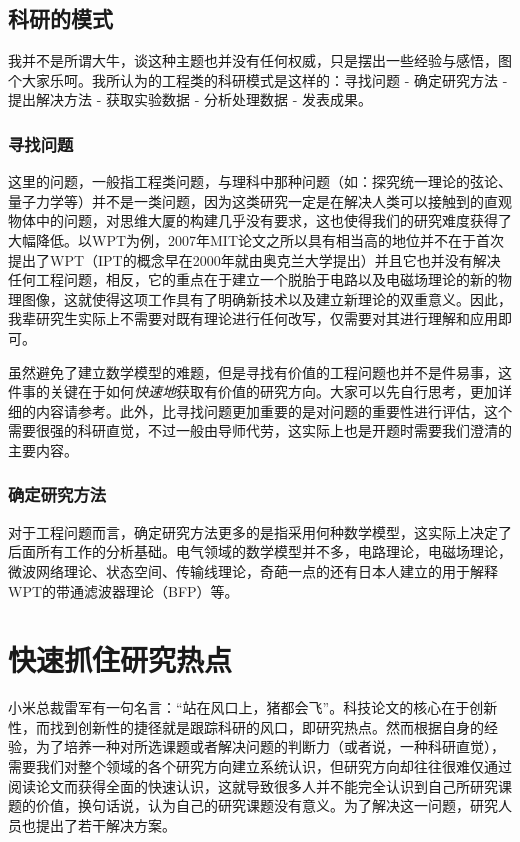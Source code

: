 \documentclass[UTF8,oneside]{ctexbook}
\begin{document}
\section{科研的模式}
我并不是所谓大牛，谈这种主题也并没有任何权威，只是摆出一些经验与感悟，图个大家乐呵。我所认为的工程类的科研模式是这样的：寻找问题 - 确定研究方法 - 提出解决方法 - 获取实验数据 - 分析处理数据 - 发表成果。
\subsection{寻找问题}
这里的问题，一般指工程类问题，与理科中那种问题（如：探究统一理论的弦论、量子力学等）并不是一类问题，因为这类研究一定是在解决人类可以接触到的直观物体中的问题，对思维大厦的构建几乎没有要求，这也使得我们的研究难度获得了大幅降低。以WPT为例，2007年MIT论文之所以具有相当高的地位并不在于首次提出了WPT（IPT的概念早在2000年就由奥克兰大学提出）并且它也并没有解决任何工程问题，相反，它的重点在于建立一个脱胎于电路以及电磁场理论的新的物理图像，这就使得这项工作具有了明确新技术以及建立新理论的双重意义。因此，我辈研究生实际上不需要对既有理论进行任何改写，仅需要对其进行理解和应用即可。

虽然避免了建立数学模型的难题，但是寻找有价值的工程问题也并不是件易事，这件事的关键在于如何\emph{快速地}获取有价值的研究方向。大家可以先自行思考，更加详细的内容请参考\cite{hopspot}。此外，比寻找问题更加重要的是对问题的重要性进行评估，这个需要很强的科研直觉，不过一般由导师代劳，这实际上也是开题时需要我们澄清的主要内容。
\subsection{确定研究方法}
对于工程问题而言，确定研究方法更多的是指采用何种数学模型，这实际上决定了后面所有工作的分析基础。电气领域的数学模型并不多，电路理论，电磁场理论，微波网络理论、状态空间、传输线理论，奇葩一点的还有日本人建立的用于解释WPT的带通滤波器理论（BFP）等。

\chapter{快速抓住研究热点}\label{hopspot}
小米总裁雷军有一句名言：“站在风口上，猪都会飞”。科技论文的核心在于创新性，而找到创新性的捷径就是跟踪科研的风口，即研究热点。然而根据自身的经验，为了培养一种对所选课题或者解决问题的判断力（或者说，一种科研直觉），需要我们对整个领域的各个研究方向建立系统认识，但研究方向却往往很难仅通过阅读论文而获得全面的快速认识，这就导致很多人并不能完全认识到自己所研究课题的价值，换句话说，认为自己的研究课题没有意义。为了解决这一问题，研究人员也提出了若干解决方案。
\end{document}
